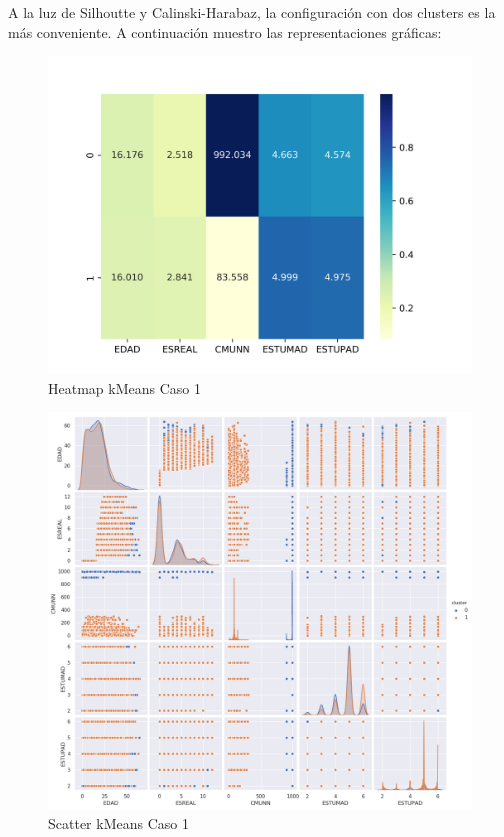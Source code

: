 A la luz de Silhoutte y Calinski-Harabaz, la configuración con dos clusters es la más conveniente. A continuación muestro las representaciones gráficas:

\begin{figure}[H] %
	\centering
	\includegraphics[scale=0.8]{heatmap-km-1.png}  %
	\caption{Heatmap kMeans Caso 1} 
	\label{fig:hm-km-caso1}
\end{figure}

\begin{figure}[H] %
	\centering
	\includegraphics[scale=0.4]{kmeans-1.png}  %
	\caption{Scatter kMeans Caso 1} 
	\label{fig:sc-km-caso1}
\end{figure}

